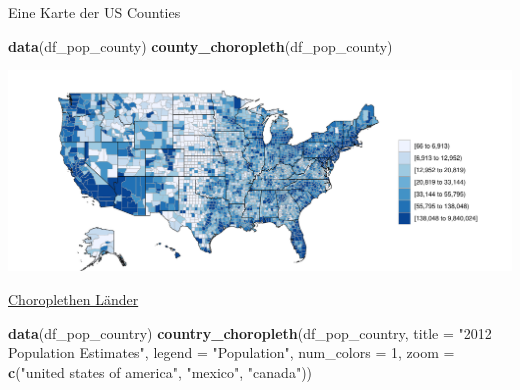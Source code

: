 \documentclass[ignorenonframetext,]{beamer}
\newenvironment{Shaded}{\begin{snugshade}}{\end{snugshade}}
\newcommand{\DataTypeTok}[1]{\textcolor[rgb]{0.13,0.29,0.53}{#1}}
\newcommand{\DecValTok}[1]{\textcolor[rgb]{0.00,0.00,0.81}{#1}}
\newcommand{\KeywordTok}[1]{\textcolor[rgb]{0.13,0.29,0.53}{\textbf{#1}}}
\newcommand{\NormalTok}[1]{#1}
\newcommand{\StringTok}[1]{\textcolor[rgb]{0.31,0.60,0.02}{#1}}
\begin{document}
\begin{frame}[fragile]{Eine Karte der US Counties}
\protect\hypertarget{eine-karte-der-us-counties}{}

\begin{Shaded}
\begin{Highlighting}[]
\KeywordTok{data}\NormalTok{(df_pop_county)}
\KeywordTok{county_choropleth}\NormalTok{(df_pop_county)}
\end{Highlighting}
\end{Shaded}

\includegraphics{A5_Choroplethen_files/figure-beamer/unnamed-chunk-25-1.pdf}

\end{frame}

\begin{frame}[fragile]{\href{http://mirrors.softliste.de/cran/web/packages/choroplethr/vignettes/d-country-choropleth.html}{Choroplethen
Länder}}
\protect\hypertarget{choroplethen-lander}{}

\begin{Shaded}
\begin{Highlighting}[]
\KeywordTok{data}\NormalTok{(df_pop_country)}
\KeywordTok{country_choropleth}\NormalTok{(df_pop_country,}
              \DataTypeTok{title      =} \StringTok{"2012 Population Estimates"}\NormalTok{,}
              \DataTypeTok{legend     =} \StringTok{"Population"}\NormalTok{,}
              \DataTypeTok{num_colors =} \DecValTok{1}\NormalTok{,}
              \DataTypeTok{zoom       =} \KeywordTok{c}\NormalTok{(}\StringTok{"united states of america"}\NormalTok{,}
                             \StringTok{"mexico"}\NormalTok{, }\StringTok{"canada"}\NormalTok{))}
\end{Highlighting}
\end{Shaded}

\end{frame}
\end{document}
